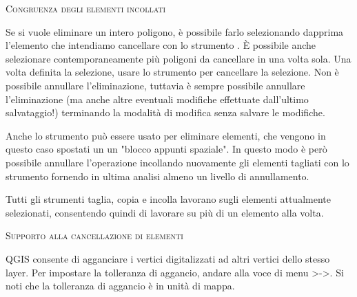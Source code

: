 \begin{Tip}[ht]\caption{\textsc{Congruenza degli elementi incollati}}
\end{Tip}


Se si vuole eliminare un intero poligono, è possibile farlo selezionando
dapprima l'elemento che intendiamo cancellare con lo strumento
. È possibile anche selezionare
contemporaneamente più poligoni da cancellare in una volta sola. Una volta
definita la selezione, usare lo strumento
 per cancellare la
selezione. Non è possibile annullare l'eliminazione, tuttavia è sempre
possibile annullare l'eliminazione (ma anche altre eventuali modifiche
effettuate dall'ultimo salvataggio!) terminando la modalità di modifica senza
salvare le modifiche.

Anche lo strumento  può essere
usato per eliminare elementi, che vengono in questo caso spostati un un
"blocco appunti spaziale". In questo modo è però possibile annullare
l'operazione incollando nuovamente gli elementi tagliati con lo strumento
 fornendo in ultima
analisi almeno un livello di annullamento.

Tutti gli strumenti taglia, copia e incolla lavorano sugli elementi
attualmente selezionati, consentendo quindi di lavorare su più di un elemento
alla volta.

\begin{Tip}[ht]\caption{\textsc{Supporto alla cancellazione di elementi}}
\end{Tip}

QGIS consente di agganciare i vertici digitalizzati ad altri vertici dello
stesso layer. Per impostare la tolleranza di aggancio, andare alla voce di
menu >->.
Si noti che la tolleranza di aggancio è in unità di mappa.

